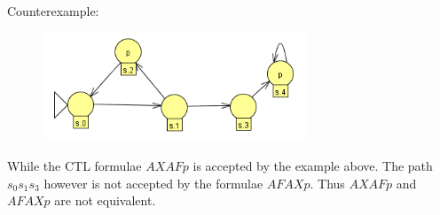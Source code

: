 

Counterexample: 

\begin{figure}[h]
	\centering
	\includegraphics[width=0.7\textwidth]{Gegenbeispiel.png}
\end{figure}

While the CTL formulae $AXAFp$ is accepted by the example above. The path $s_0s_1s_3$ however is not accepted by the formulae $AFAXp$. Thus $AXAFp$ and $AFAXp$ are not equivalent.

